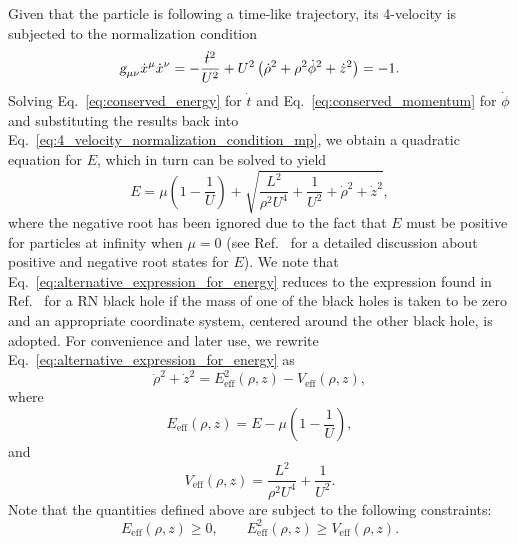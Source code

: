 Given that the particle is following a time-like trajectory, its 4-velocity is subjected to the normalization condition
%
\begin{equation}
  \mtrtens{\mu}{\nu} \dot{x}^\mu \dot{x}^\nu = -\frac{\dot{t}^2}{U^2} + U^2\left( \dot{\rho}^2 + \rho^2\dot{\phi}^2 + \dot{z}^2 \right) = -1.
  \label{eq:4_velocity_normalization_condition_mp}
\end{equation}
%
Solving Eq.~\eqref{eq:conserved_energy} for $\dot{t}$ and Eq.~\eqref{eq:conserved_momentum} for $\dot{\phi}$ and substituting the results back into Eq.~\eqref{eq:4_velocity_normalization_condition_mp}, we obtain a quadratic equation for $E$, which in turn can be solved to yield
%
\begin{equation}
  E = \mu\left(1-\frac{1}{U}\right) + \sqrt{\frac{L^2}{\rho^2U^4} + \frac{1}{U^2} + \dot{\rho}^2 + \dot{z}^2},
  \label{eq:alternative_expression_for_energy}
\end{equation}
%
where the negative root has been ignored due to the fact that $E$ must be positive for particles at infinity when $\mu = 0$ (see Ref.~\cite{RUFFINI1971} for a detailed discussion about positive and negative root states for $E$). We note that Eq.~\eqref{eq:alternative_expression_for_energy} reduces to the expression found in Ref.~\cite{DENARDO1973} for a RN black hole if the mass of one of the black holes is taken to be zero and an appropriate coordinate system, centered around the other black hole, is adopted. For convenience and later use, we rewrite Eq.~\eqref{eq:alternative_expression_for_energy} as
\begin{equation} \label{eq:effective1}
  \dot{\rho}^2 + \dot{z}^2 = E_{\mathrm {eff}}^2(\rho,z) - V_{\mathrm {eff}}(\rho,z),
\end{equation}
where
\begin{equation} \label{eq:effective2}
  E_{\mathrm {eff}}(\rho,z) = E - \mu\left(1-\frac{1}{U}\right),
\end{equation}
and
\begin{equation} \label{eq:effective3}
  V_{\mathrm {eff}}(\rho,z) =\frac{L^2}{\rho^2U^4} + \frac{1}{U^2}.
\end{equation}
Note that the quantities defined above are subject to the following constraints:
\begin{equation} \label{eq:effective_constraints}
  E_{\mathrm {eff}}(\rho,z) \ge 0, \qquad E_{\mathrm {eff}}^2(\rho,z) \ge V_{\mathrm {eff}}(\rho,z).
\end{equation}

